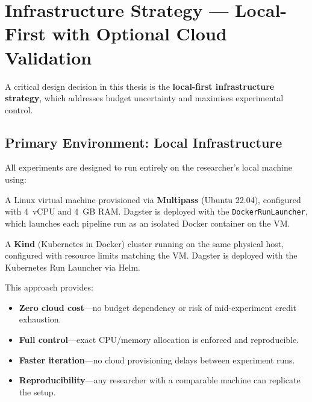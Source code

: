
\section{Infrastructure Strategy --- Local-First with Optional Cloud Validation}
\label{sec:infrastructure}

A critical design decision in this thesis is the \textbf{local-first infrastructure strategy}, which addresses budget uncertainty and maximises experimental control.

\subsection{Primary Environment: Local Infrastructure}
\label{subsec:local-infra}

All experiments are designed to run entirely on the researcher's local machine using:

\begin{description}[style=nextline]
  \item[VM Baseline] A Linux virtual machine provisioned via \textbf{Multipass} (Ubuntu 22.04), configured with 4~vCPU and 4~GB RAM. Dagster is deployed with the \texttt{DockerRunLauncher}, which launches each pipeline run as an isolated Docker container on the VM.
  \item[Kubernetes Comparison] A \textbf{Kind} (Kubernetes in Docker) cluster running on the same physical host, configured with resource limits matching the VM. Dagster is deployed with the Kubernetes Run Launcher via Helm.
\end{description}

This approach provides:

\begin{itemize}
  \item \textbf{Zero cloud cost}---no budget dependency or risk of mid-experiment credit exhaustion.
  \item \textbf{Full control}---exact CPU/memory allocation is enforced and reproducible.
  \item \textbf{Faster iteration}---no cloud provisioning delays between experiment runs.
  \item \textbf{Reproducibility}---any researcher with a comparable machine can replicate the setup.
\end{itemize}

